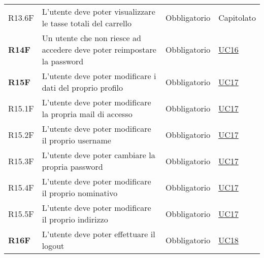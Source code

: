 \begin{center}
\begin{longtable}[!h]{p{50px} p{245px} p{75px} p{50px}}
        R13.6F                                & L'utente deve poter visualizzare le tasse totali del carrello                                                                                          & Obbligatorio             & Capitolato                                     \\
        \textbf{R14F}                         & Un utente che non riesce ad accedere deve poter reimpostare la password                                                                                & Obbligatorio             & \hyperref[sec:UC16]{UC16}                      \\
        \textbf{R15F}                         & L'utente deve poter modificare i dati del proprio profilo                                                                                              & Obbligatorio             & \hyperref[sec:UC17]{UC17}                      \\
        R15.1F                                & L'utente deve poter modificare la propria mail di accesso                                                                                              & Obbligatorio             & \hyperref[sec:UC17]{UC17}                      \\
        R15.2F                                & L'utente deve poter modificare il proprio username                                                                                                     & Obbligatorio             & \hyperref[sec:UC17]{UC17}                      \\
        R15.3F                                & L'utente deve poter cambiare la propria password                                                                                                       & Obbligatorio             & \hyperref[sec:UC17]{UC17}                      \\
        R15.4F                                & L'utente deve poter modificare il proprio nominativo                                                                                                   & Obbligatorio             & \hyperref[sec:UC17]{UC17}                      \\
        R15.5F                                & L'utente deve poter modificare il proprio indirizzo                                                                                                    & Obbligatorio             & \hyperref[sec:UC17]{UC17}                      \\
        \textbf{R16F}                         & L'utente deve poter effettuare il logout                                                                                                               & Obbligatorio             & \hyperref[sec:UC18]{UC18}                      \\

\end{longtable}
\end{center}
